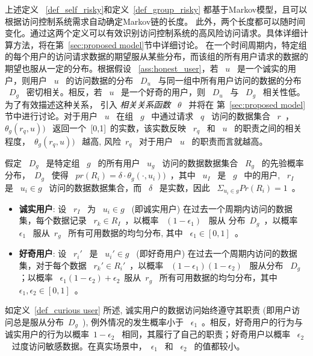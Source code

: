 上述定义 ~\ref{def_self_risky}和定义~\ref{def_group_risky} 都基于Markov模型，且可以根据访问控制系统需求自动确定Markov链的长度。 此外，两个长度都可以随时间变化。通过这两个定义可以有效识别访问控制系统的高风险访问请求。具体详细计算方法，将在第~\ref{sec:proposed model}节中详细讨论。 在一个时间周期内，特定组的每个用户的访问请求数据的期望服从某些分布，而该组的所有用户请求的数据的期望也服从一定的分布。根据假设 ~\ref{ass:honest_user}，若 ~$u$~ 是一个诚实的用户，则用户 ~$u$~ 的访问数据的分布 ~$D_u$~ 与同一组中所有用户访问的数据的分布 ~$D_g$~ 密切相关。相反，若 ~$u$~ 是一个好奇的用户，则 ~$D_u$~ 与 ~$D_g$~ 相关性低。 为了有效描述这种关系， 引入 \emph{相关关系函数} ~$\theta$~ 并将在 第~\ref{sec:proposed model}节中进行讨论。对于用户 ~$u$~ 在组 ~$g$~ 中通过请求 ~$q$~ 访问的数据集合 ~$r$~，~$\theta_g (r_q,u))$~ 返回一个~[0,1]~的实数，该实数反映 ~$r_q$~ 和 ~$u$~ 的职责之间的相关程度，~$\theta_g (r_q,u))$~ 越高, 风险~$r_q$~ 对于用户 ~$u$~ 的职责而言就越高。


\begin{definition}%
	\label{def_curious user}
	假定 ~$D_g$~ 是特定组 ~$g$~ 的所有用户 ~$u_g$~ 访问的数据数据集合 ~$R_g$~ 的先验概率分布，~$D_g$~ 使得 ~$pr(R_i)=\delta \cdot \theta_g (\cdot,u_i))$~，其中 ~$u_I$~ 是 ~$g$~ 中的用户, ~$r_I$~ 是 ~$u_i \in g$~ 访问的数据数据集合，而 ~$\delta$~ 是实数，因此 ~$\Sigma_{u_i \in g}Pr(R_i) = 1$~。
	\begin{itemize}
		\item \textbf{诚实用户}: 设 ~$r_I$~ 为 ~$u_i \in g$~ (即诚实用户) 在过去一个周期内访问的数据集，每个数据记录 ~$r_k \in R_I$~，以概率 ~$(1-\epsilon_1)$~ 服从 分布~$D_g$~，以概率 ~$\epsilon_1$~ 服从~$r_g$~ 所有可用数据的均匀分布, 其中 ~$\epsilon_1 \in [0,1]$~。
		\item \textbf{好奇用户}: 设 ~$r_i'$~ 是 ~$u_i' \in g$~ (即好奇用户) 在过去一个周期内访问的数据集，对于每个数据 ~$r_k' \in R_i'$~，以概率 ~$(1-\epsilon_1)(1-\epsilon_2)$~ 服从分布 ~$D_g$~ ；以概率 ~$\epsilon_1 (1 - \epsilon_2)+ \epsilon_2$~服从~$r_g$~ 所有可用数据的均匀分布，其中 ~$\epsilon_1, \epsilon_2 \in [0,1]$~。
	\end{itemize}
\end{definition}

如定义~\ref{def_curious user} 所述, 诚实用户的数据访问始终遵守其职责 (即用户访问总是服从分布~$D_g$~), 例外情况的发生概率小于 ~$\epsilon_1$~。相反，好奇用户的行为与诚实用户的行为以概率~$1-\epsilon_2$~ 相同，其履行了自己的职责；好奇用户以概率 ~$\epsilon_2$~ 过度访问敏感数据。在真实场景中，~$\epsilon_1$~ 和 ~$\epsilon_2$~ 的值都较小。

